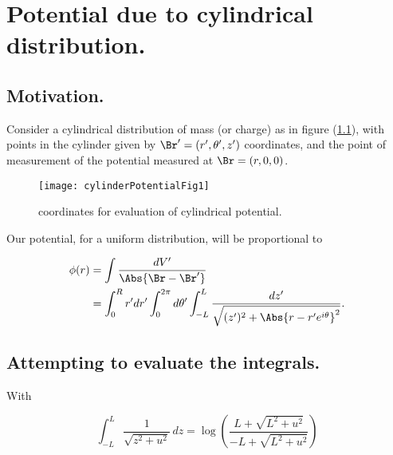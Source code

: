 
%

\chapter{Potential due to cylindrical distribution.}
\label{chap:cylinderPotential}
{}
\date{Feb 27, 2012}

\beginArtWithToc

\section{Motivation.}

Consider a cylindrical distribution of mass (or charge) as in figure (\ref{fig:cylinderPotential:cylinderPotentialFig1}), with points in the cylinder given  by $\Br' = (r', \theta ', z')$ coordinates, and the point of measurement of the potential measured at $\Br = (r, 0, 0)$.

\begin{figure}[htp]
   \centering
   \texttt{[image: cylinderPotentialFig1]}
   \caption{coordinates for evaluation of cylindrical potential.}\label{fig:cylinderPotential:cylinderPotentialFig1}
\end{figure}

Our potential, for a uniform distribution, will be proportional to

\begin{equation}\label{eqn:cylinderPotential:10}
\begin{aligned}
\phi(r) 
&= \int \frac{ dV'}{\Abs{\Br - \Br'}} \\
&=
\int_0^R r' dr' \int_0^{2 \pi } d\theta' \int_{-L}^L \frac{dz' }{\sqrt{(z')^2+ \Abs{r - r' e^{i \theta }}^2}}.
\end{aligned}
\end{equation}

\section{Attempting to evaluate the integrals.}

With

\begin{equation}\label{eqn:cylinderPotential:30}
\int_{-L}^L \frac{1}{\sqrt{z^2+u^2}} \, dz=\log \left(\frac{L+\sqrt{L^2+u^2}}{-L+\sqrt{L^2+u^2}}\right)
\end{equation}

